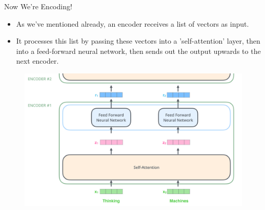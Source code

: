 \documentclass[handout]{beamer}
\begin{document}
\begin{frame}{Now We’re Encoding!}
\begin{scriptsize}


\begin{itemize}


\item As we've mentioned already, an encoder receives a list of vectors as input. 

\item It processes this list by passing these vectors into a 'self-attention' layer, then into a feed-forward neural network, then sends out the output upwards to the next encoder.

\end{itemize}

\begin{figure}[h]
        	\includegraphics[scale = 0.2]{pics/encoder_with_tensors_2.png}
        \end{figure}  


\end{scriptsize}


\end{frame}
\end{document}
